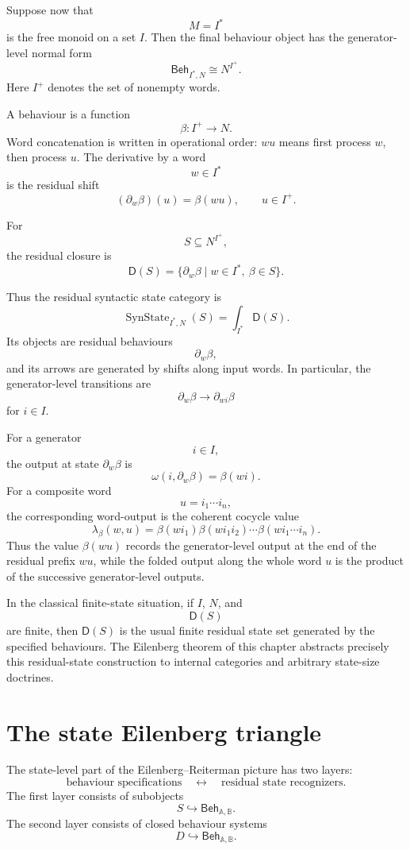 Suppose now that
\[
M=I^\ast
\]
is the free monoid on a set \(I\). Then the final behaviour object has the
generator-level normal form
\[
\mathsf{Beh}_{I^\ast,N}
\cong
N^{I^+}.
\]
Here \(I^+\) denotes the set of nonempty words.

A behaviour is a function
\[
\beta:I^+\to N.
\]
Word concatenation is written in operational order: \(wu\) means first process
\(w\), then process \(u\). The derivative by a word
\[
w\in I^\ast
\]
is the residual shift
\[
(\partial_w\beta)(u)=\beta(wu),
\qquad
u\in I^+.
\]

For
\[
S\subseteq N^{I^+},
\]
the residual closure is
\[
\mathsf D(S)
=
\{\partial_w\beta\mid w\in I^\ast,\ \beta\in S\}.
\]

Thus the residual syntactic state category is
\[
\operatorname{SynState}_{I^\ast,N}(S)
=
\int_{I^\ast}\mathsf D(S).
\]
Its objects are residual behaviours
\[
\partial_w\beta,
\]
and its arrows are generated by shifts along input words. In particular, the
generator-level transitions are
\[
\partial_w\beta
\longrightarrow
\partial_{wi}\beta
\]
for \(i\in I\).

For a generator
\[
i\in I,
\]
the output at state \(\partial_w\beta\) is
\[
\omega(i,\partial_w\beta)=\beta(wi).
\]
For a composite word
\[
u=i_1\cdots i_n,
\]
the corresponding word-output is the coherent cocycle value
\[
\lambda_\beta(w,u)
=
\beta(wi_1)\beta(wi_1i_2)\cdots
\beta(wi_1\cdots i_n).
\]
Thus the value \(\beta(wu)\) records the generator-level output at the end of
the residual prefix \(wu\), while the folded output along the whole word
\(u\) is the product of the successive generator-level outputs.

In the classical finite-state situation, if \(I\), \(N\), and
\[
\mathsf D(S)
\]
are finite, then \(\mathsf D(S)\) is the usual finite residual state set
generated by the specified behaviours. The Eilenberg theorem of this chapter
abstracts precisely this residual-state construction to internal categories
and arbitrary state-size doctrines.

\section{The state Eilenberg triangle}
\label{sec:state-eilenberg-triangle}

The state-level part of the Eilenberg--Reiterman picture has two layers:
\[
\text{behaviour specifications}
\quad\longleftrightarrow\quad
\text{residual state recognizers}.
\]
The first layer consists of subobjects
\[
S\hookrightarrow\mathsf{Beh}_{\mathbb A,\mathbb B}.
\]
The second layer consists of closed behaviour systems
\[
D\hookrightarrow\mathsf{Beh}_{\mathbb A,\mathbb B}.
\]

